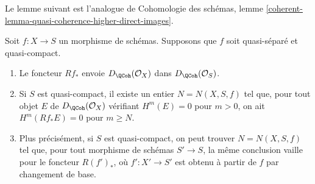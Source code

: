 \noindent
Le lemme suivant est l'analogue de
Cohomologie des schémas, lemme
\ref{coherent-lemma-quasi-coherence-higher-direct-images}.

\begin{lemma}
\label{lemma-quasi-coherence-direct-image}
Soit $f : X \to S$ un morphisme de schémas.
Supposons que $f$ soit quasi-séparé et quasi-compact.
\begin{enumerate}
\item Le foncteur $Rf_*$ envoie $D_\QCoh(\mathcal{O}_X)$
dans $D_\QCoh(\mathcal{O}_S)$.
\item Si $S$ est quasi-compact, il existe un entier $N = N(X, S, f)$
tel que, pour tout objet $E$ de $D_\QCoh(\mathcal{O}_X)$
vérifiant $H^m(E) = 0$ pour $m > 0$, on ait
$H^m(Rf_*E) = 0$ pour $m \geq N$.
\item Plus précisément, si $S$ est quasi-compact, on peut trouver $N = N(X, S, f)$
tel que, pour tout morphisme de schémas $S' \to S$,
la même conclusion vaille pour le foncteur $R(f')_*$,
où $f' : X' \to S'$ est obtenu à partir de $f$ par changement de base.
\end{enumerate}
\end{lemma}

